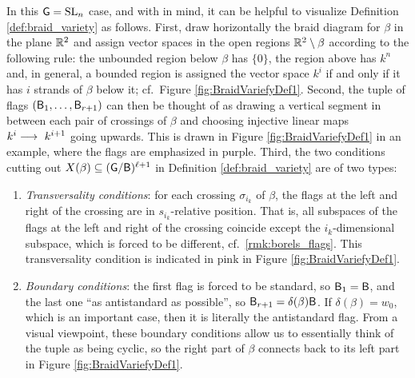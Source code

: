 In this $\mathsf{G}=\operatorname{SL}_n$ case, and with   in mind, it can be helpful to visualize Definition \ref{def:braid_variety} as follows. First, draw horizontally the braid diagram for $\beta$ in the plane $\mathbb{R}^2$ and assign vector spaces in the open regions $\mathbb{R}^2\setminus\beta$ according to the following rule: the unbounded region below $\beta$ has $\{0\}$, the region above has $k^n$ and, in general, a bounded region is assigned the vector space $k^i$ if and only if it has $i$ strands of $\beta$ below it; cf.~Figure \ref{fig:BraidVariefyDef1}. Second, the tuple of flags $(\mathsf{B}_1, \dots, \mathsf{B}_{r+1})$ can then be thought of as drawing a vertical segment in between each pair of crossings of $\beta$ and choosing injective linear maps $k^i\lr\ k^{i+1}$ going upwards. This is drawn in Figure \ref{fig:BraidVariefyDef1} in an example, where the flags are emphasized in purple. Third, the two conditions cutting out $X(\beta)\subseteq (\mathsf{G}/\mathsf{B})^{\ell + 1}$ in Definition \ref{def:braid_variety} are of two types:

\begin{enumerate}
    \item {\it Transversality conditions}: for each crossing $\sigma_{i_k}$ of $\beta$, the flags at the left and right of the crossing are in $s_{i_k}$-relative position. That is, all subspaces of the flags at the left and right of the crossing coincide except the $i_k$-dimensional subspace, which is forced to be different, cf.~\cref{rmk:borels_flags}. This transversality condition is indicated in pink in Figure \ref{fig:BraidVariefyDef1}.\\

    \item {\it Boundary conditions}: the first flag is forced to be standard, so $\mathsf{B}_1=\mathsf{B}$, and the last one ``as antistandard as possible'', so $\mathsf{B}_{r + 1} = \delta(\beta) \mathsf{B}$. If $\delta(\beta)=w_0$, which is an important case, then it is literally the antistandard flag. From a visual viewpoint, these boundary conditions allow us to essentially think of the tuple as being cyclic, so the right part of $\beta$ connects back to its left part in Figure \ref{fig:BraidVariefyDef1}.
\end{enumerate}


